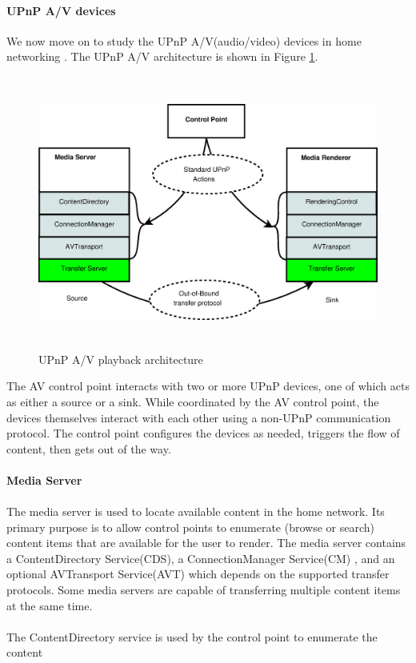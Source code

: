 \paragraph{UPnP A/V devices}
We now move on to study the UPnP A/V(audio/video) devices in home networking
\label{upnpav}. The UPnP A/V architecture is shown in Figure
\ref{upnp_playback}.
\begin{figure}[hb] 
\centering \includegraphics[height=9cm]{charts/upnp_playback} 
\caption{UPnP A/V playback architecture \label{upnp_playback}} 
\end{figure}
The AV control point interacts with two or more UPnP
devices, one of which acts as either a source or a sink. While coordinated by
the AV control point, the devices themselves interact with each other using a
non-UPnP communication protocol. The control point configures the devices as
needed, triggers the flow of content, then gets out of the way.\\
\\
\textbf{Media Server} \\ 
\\
The media server is used to locate available content in the home network. Its 
primary purpose is to allow control points to enumerate (browse or search) 
content items that are available for the user to render. The media server 
contains a ContentDirectory Service(CDS), a ConnectionManager Service(CM) 
, and an optional AVTransport Service(AVT) which depends on the supported 
transfer protocols. Some media servers are capable of transferring multiple 
content items at the same time. \\
\\
The ContentDirectory service is used by the control point to enumerate the content 
